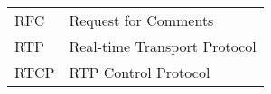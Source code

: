 \begin{longtable}{ll}
RFC & Request for Comments\\
RTP & Real-time Transport Protocol\\
RTCP & RTP Control Protocol\\
\end{longtable}
